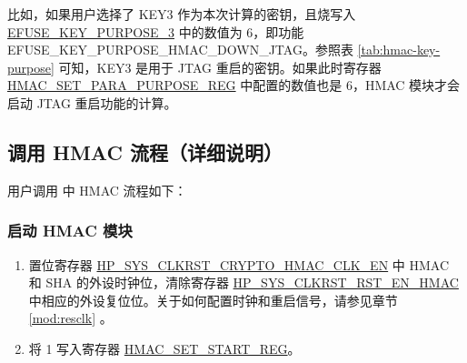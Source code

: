 \documentclass[main\_\_CN.tex]{subfiles}
\begin{document}
比如，如果用户选择了 KEY3 作为本次计算的密钥，且烧写入 \hyperref[fielddesc:EFUSEKEYPURPOSE3]{EFUSE\_KEY\_PURPOSE\_3} 中的数值为 6，即功能 EFUSE\_KEY\_PURPOSE\_HMAC\_DOWN\_JTAG。参照表 \ref{tab:hmac-key-purpose} 可知，KEY3 是用于 JTAG 重启的密钥。如果此时寄存器 \hyperref[regdesc:HMACSETPARAPURPOSEREG]{HMAC\_SET\_PARA\_PURPOSE\_REG} 中配置的数值也是 6，HMAC 模块才会启动 JTAG 重启功能的计算。



\subsection{调用 HMAC 流程（详细说明）}
\label{sec:hmac-process-detailed}
用户调用 \chipname{} 中 HMAC 流程如下：

\subsubsection{启动 HMAC 模块}
\label{sec:hmac-enable-module}

    \begin{enumerate}
        \item 置位寄存器 \hyperref[fielddesc:HPSYSCLKRSTCRYPTOHMACCLKEN]{HP\_SYS\_CLKRST\_CRYPTO\_HMAC\_CLK\_EN} 中 HMAC 和 SHA 的外设时钟位，清除寄存器 \hyperref[fielddesc:HPSYSCLKRSTRSTENHMAC]{HP\_SYS\_CLKRST\_RST\_EN\_HMAC} 中相应的外设复位位。关于如何配置时钟和重启信号，请参见章节 \ref{mod:resclk} \textit{}。
        \item 将 1 写入寄存器 \hyperref[regdesc:HMACSETSTARTREG]{HMAC\_SET\_START\_REG}。
    \end{enumerate}
\end{document}
